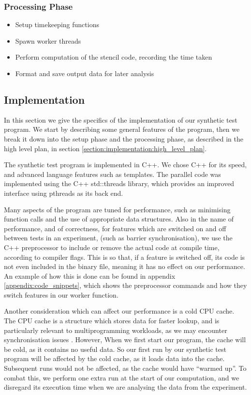 \subsubsection{Processing Phase}
\label{section:implementation:procesing_phase}

\begin{itemize}
    \item Setup timekeeping functions
    \item Spawn worker threads
    \item Perform computation of the stencil code, recording the time taken
    \item Format and save output data for later analysis
\end{itemize}



\subsection{Implementation}
\label{section:implementation:implementation}

In this section we give the specifics of the implementation of our synthetic test program. We start by describing some general features of the program, then we break it down into the setup phase and the processing phase, as described in the high level plan, in section \ref{section:implementation:high_level_plan}.

The synthetic test program is implemented in C++. We chose C++ for its speed, and advanced language features such as templates. The parallel code was implemented using the C++ std::threads library, which provides an improved interface using pthreads as its back end.

Many aspects of the program are tuned for performance, such as minimising function calls and the use of appropriate data structures. Also in the name of performance, and of correctness, for features which are switched on and off between tests in an experiment, (such as barrier synchronisation), we use the C++ preprocessor to include or remove the actual code at compile time, according to compiler flags. This is so that, if a feature is switched off, its code is not even included in the binary file, meaning it has no effect on our performance. An example of how this is done can be found in appendix \ref{appendix:code_snippets}, which shows the preprocessor commands and how they switch features in our worker function.

Another consideration which can affect our performance is a cold CPU cache. The CPU cache is a structure which stores data for faster lookup, and is particularly relevant to multiprogramming workloads, as we may encounter synchronisation issues \cite{agarwal_hennessy_horowitz_1988}. However, When we first start our program, the cache will be cold, as it contains no useful data. So our first run by our synthetic test program will be affected by the cold cache, as it loads data into the cache. Subsequent runs would not be affected, as the cache would have ``warmed up''. To combat this, we perform one extra run at the start of our computation, and we disregard its execution time when we are analysing the data from the experiment.



